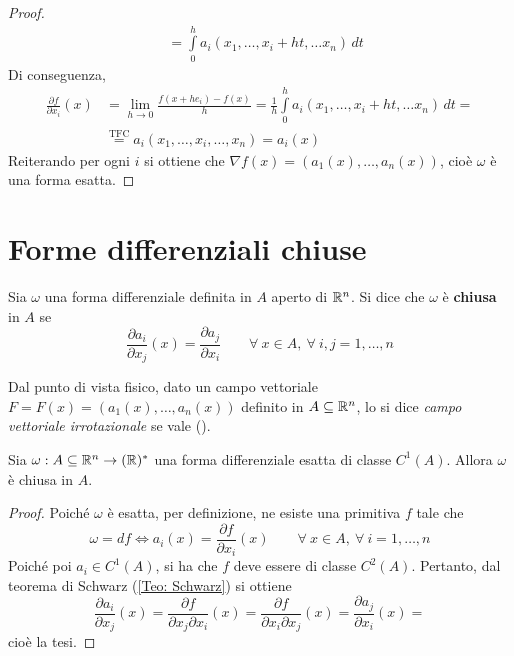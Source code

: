 \begin{proof}
\begin{equation}
\begin{aligned}
    &=\int\limits_{0}^{h}{a_i(x_1, \dots, x_i+ht, \dots x_n)}\, dt
\end{aligned}
\end{equation}
Di conseguenza, 
\begin{equation}
\begin{aligned}
    \frac{\partial{f}}{\partial x_i}{(x)}&= \lim_{h\to 0}{\frac{f(x+he_i)-f(x)}{h}}= \frac{1}{h}{\int\limits_{0}^{h}{a_i(x_1, \dots, x_i+ht, \dots x_n)}\, dt}=\\
    &\overset{\text{TFC}}{=} a_i(x_1, \dots, x_i, \dots, x_n) = a_i (x)
\end{aligned}
\end{equation}
Reiterando per ogni $i$ si ottiene che $\nabla f(x)= (a_1(x), \dots, a_n(x))$, cioè $\omega$ è una forma esatta. 
\end{proof}
\section{Forme differenziali chiuse}
\begin{definition} \label{Def: Forma differenziale chiusa}
    Sia $\omega$ una forma differenziale definita in $A$ aperto di $\mathbb{R}^n$. Si dice che $\omega$ è \textbf{chiusa} in $A$ se
    \begin{equation}
        \frac{\partial a_i}{\partial x_j}(x)= \frac{\partial a_j}{\partial x_i} \qquad \forall\ x \in A,\ \forall\ i, j = 1, \dots, n
    \end{equation}
\end{definition}
Dal punto di vista fisico, dato un campo vettoriale $F=F(x)=(a_1(x), \dots, a_n(x))$ definito in $A \subseteq \mathbb{R}^n$, lo si dice \textit{campo vettoriale irrotazionale} se vale (\theequation). 
\begin{theorem} \label{Teo: Forma esatta => forma chiusa}
    Sia $\omega: A \subseteq \mathbb{R}^n \to (\mathbb{R})^*$ una forma differenziale esatta di classe $C^1(A)$. Allora $\omega$ è chiusa in $A$.
\end{theorem}
\begin{proof}
    Poiché $\omega$ è esatta, per definizione, ne esiste una primitiva $f$ tale che
    \begin{equation}
        \omega= df \iff a_i(x)=\frac{\partial f }{\partial x_i}(x) \qquad \forall\ x \in A,\ \forall\ i=1, \dots, n
    \end{equation}
    Poiché poi $a_i \in C^1(A)$, si ha che $f$ deve essere di classe $C^2(A)$. Pertanto, dal teorema di Schwarz (\ref{Teo: Schwarz}) si ottiene
    \begin{equation}
        \frac{\partial a_i}{\partial x_j}(x)= \frac{\partial f}{\partial x_j \partial x_i}(x) = \frac{\partial f}{\partial x_i \partial x_j}(x) = \frac{\partial a_j}{\partial x_i}(x)= 
    \end{equation}
    cioè la tesi.
\end{proof}
